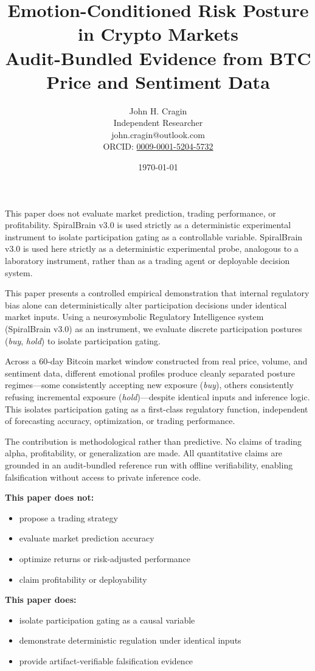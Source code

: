 \documentclass[12pt,a4paper]{article}
\title{Emotion-Conditioned Risk Posture in Crypto Markets\\
\large Audit-Bundled Evidence from BTC Price and Sentiment Data}
\author{John H. Cragin\\
Independent Researcher\\
john.cragin@outlook.com\\
ORCID: \href{https://orcid.org/0009-0001-5204-5732}{0009-0001-5204-5732}}
\date{\today}
\renewenvironment{abstract}{
    \begin{center}
        {\large\bfseries \abstractname\vspace{-.5em}\vspace{0pt}}
    \end{center}
}{}
\begin{document}
\maketitle

\begin{abstract}
This paper does not evaluate market prediction, trading performance, or profitability. SpiralBrain v3.0 is used strictly as a deterministic experimental instrument to isolate participation gating as a controllable variable. SpiralBrain v3.0 is used here strictly as a deterministic experimental probe, analogous to a laboratory instrument, rather than as a trading agent or deployable decision system.

This paper presents a controlled empirical demonstration that internal regulatory bias alone can deterministically alter participation decisions under identical market inputs. Using a neurosymbolic Regulatory Intelligence system (SpiralBrain v3.0) as an instrument, we evaluate discrete participation postures (\emph{buy}, \emph{hold}) to isolate participation gating.

Across a 60-day Bitcoin market window constructed from real price, volume, and sentiment data, different emotional profiles produce cleanly separated posture regimes—some consistently accepting new exposure (\emph{buy}), others consistently refusing incremental exposure (\emph{hold})—despite identical inputs and inference logic. This isolates participation gating as a first-class regulatory function, independent of forecasting accuracy, optimization, or trading performance.

The contribution is methodological rather than predictive. No claims of trading alpha, profitability, or generalization are made. All quantitative claims are grounded in an audit-bundled reference run with offline verifiability, enabling falsification without access to private inference code.
\end{abstract}

\begin{tcolorbox}[colback=gray!10, colframe=gray!50, title=What This Paper Is NOT]
\textbf{This paper does not:}
\begin{itemize}
\item propose a trading strategy
\item evaluate market prediction accuracy
\item optimize returns or risk-adjusted performance
\item claim profitability or deployability
\end{itemize}

\textbf{This paper does:}
\begin{itemize}
\item isolate participation gating as a causal variable
\item demonstrate deterministic regulation under identical inputs
\item provide artifact-verifiable falsification evidence
\end{itemize}
\end{tcolorbox}
\end{document}

